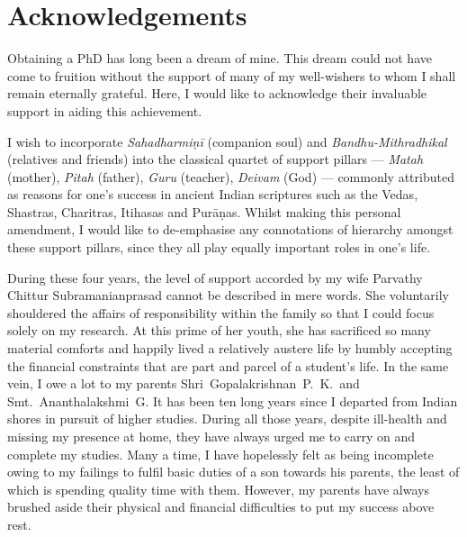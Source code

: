 
\chapter*{Acknowledgements}
\vspace*{-12mm}

Obtaining a PhD has long been a dream of mine. This dream could not have come to
fruition without the support of many of my well-wishers to whom I shall remain
eternally grateful. Here, I would like to acknowledge their invaluable support
in aiding this achievement.

I wish to incorporate \emph{Sahadharmiṇī} (companion soul) and
\emph{Bandhu-Mithradhikal} (relatives and friends) into the classical quartet of
support pillars --- \emph{Matah} (mother), \emph{Pitah} (father), \emph{Guru}
(teacher), \emph{Deivam} (God) --- commonly attributed as reasons for one's
success in ancient Indian scriptures such as the Vedas, Shastras, Charitras, 
Itihasas and Purāṇas. Whilst making this personal amendment, I would like to
de-emphasise any connotations of hierarchy amongst these support pillars, since
they all play equally important roles in one's life.

During these four years, the level of support accorded by my wife Parvathy
Chittur Subramanianprasad cannot be described in mere words. She voluntarily
shouldered the affairs of responsibility within the family so that I could focus
solely on my research. At this prime of her youth, she has sacrificed so many
material comforts and happily lived a relatively austere life by humbly
accepting the financial constraints that are part and parcel of a student's
life. In the same vein, I owe a lot to my parents Shri~Gopalakrishnan~P.~K.\ and
Smt.~Ananthalakshmi~G. It has been ten long years since I departed from Indian
shores in pursuit of higher studies. During all those years, despite ill-health
and missing my presence at home, they have always urged me to carry on and
complete my studies. Many a time, I have hopelessly felt as being incomplete
owing to my failings to fulfil basic duties of a son towards his parents, the
least of which is spending quality time with them. However, my parents have
always brushed aside their physical and financial difficulties to put my success
above rest.

